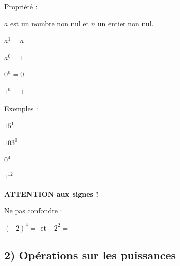 \documentclass[12pt]{article}
\begin{document}
\begin{minipage}[t]{.45\textwidth}%
    \vspace{0pt}
    \begin{mdframed}[
        linewidth=1pt,
        roundcorner=5pt,
        linecolor=Red,
        innertopmargin=10pt,
        innerbottommargin=10pt
    ]
    {\color{red}
    \underline{Propriété :}

    \vspace{5pt}
    $a$ est un nombre non nul et $n$ un entier non nul.
    
    \vspace{5pt}
    \hspace{1cm}$a^1 = a$

    \hspace{1cm}$a^0 = 1$

    \hspace{1cm}$0^n = 0$

    \hspace{1cm}$1^n = 1$
    }
    \end{mdframed}
\end{minipage}%
\hfill
\begin{minipage}[t]{.45\textwidth}%
    \vspace{0pt}
    \underline{Exemples :}

    \vspace{20pt}
    $15^1 =$

    \vspace{20pt}
    $103^0 = $

    \vspace{20pt}
    $0^4 = $

    \vspace{20pt}
    $1^{12} = $
\end{minipage}%

\vspace{1cm}

{\color{red} \textbf{ATTENTION aux signes !}}

\vspace{10pt}
Ne pas confondre : 

\vspace{10pt}
$(-2)^4 = $ \hspace{6cm} et $-2^2 = $

\vspace{2cm}

\subsection*{\hspace{1cm} 2) Opérations sur les puissances}
\end{document}
